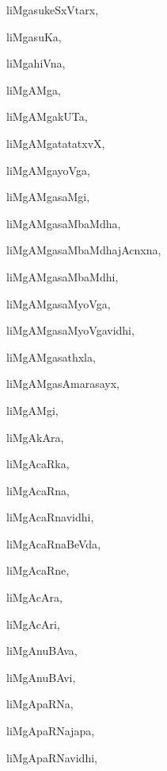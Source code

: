 \begin{multicols}{3}
{\noindent
{liMgasukeSxVtarx}, \pageref{liMgasukeSxVtarx}

\noindent
{liMgasuKa}, \pageref{liMgasuKa}

\noindent
{liMgahiVna}, \pageref{liMgahiVna}

\noindent
{liMgAMga}, \pageref{liMgAMga}

\noindent
{liMgAMgakUTa}, \pageref{liMgAMgakUTa}

\noindent
{liMgAMgatatatxvX}, \pageref{liMgAMgatatatxvX}

\noindent
{liMgAMgayoVga}, \pageref{liMgAMgayoVga}

\noindent
{liMgAMgasaMgi}, \pageref{liMgAMgasaMgi}

\noindent
{liMgAMgasaMbaMdha}, \pageref{liMgAMgasaMbaMdha}

\noindent
{liMgAMgasaMbaMdhajAcnxna}, \pageref{liMgAMgasaMbaMdhajAcnxna}

\noindent
{liMgAMgasaMbaMdhi}, \pageref{liMgAMgasaMbaMdhi}

\noindent
{liMgAMgasaMyoVga}, \pageref{liMgAMgasaMyoVga}

\noindent
{liMgAMgasaMyoVgavidhi}, \pageref{liMgAMgasaMyoVgavidhi}

\noindent
{liMgAMgasathxla}, \pageref{liMgAMgasathxla}

\noindent
{liMgAMgasAmarasayx}, \pageref{liMgAMgasAmarasayx}

\noindent
{liMgAMgi}, \pageref{liMgAMgi}

\noindent
{liMgAkAra}, \pageref{liMgAkAra}

\noindent
{liMgAcaRka}, \pageref{liMgAcaRka}

\noindent
{liMgAcaRna}, \pageref{liMgAcaRna}

\noindent
{liMgAcaRnavidhi}, \pageref{liMgAcaRnavidhi}

\noindent
{liMgAcaRnaBeVda}, \pageref{liMgAcaRnaBeVda}

\noindent
{liMgAcaRne}, \pageref{liMgAcaRne}

\noindent
{liMgAcAra}, \pageref{liMgAcAra}

\noindent
{liMgAcAri}, \pageref{liMgAcAri}

\noindent
{liMgAnuBAva}, \pageref{liMgAnuBAva}

\noindent
{liMgAnuBAvi}, \pageref{liMgAnuBAvi}

\noindent
{liMgApaRNa}, \pageref{liMgApaRNa}

\noindent
{liMgApaRNajapa}, \pageref{liMgApaRNajapa}

\noindent
{liMgApaRNavidhi}, \pageref{liMgApaRNavidhi}

}
\end{multicols}
